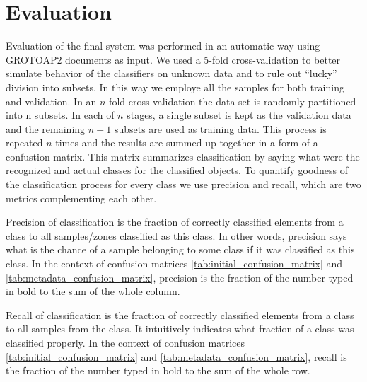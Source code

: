 \chapter{Evaluation}\label{chapter:evaluation}
Evaluation of the final system was performed in an automatic way using GROTOAP2 documents as input. We used a 5-fold cross-validation to better simulate behavior of the classifiers on unknown data and to rule out ``lucky'' division into subsets. In this way we employe all the samples for both training and validation. In an $n$-fold cross-validation the data set is randomly partitioned into n subsets. In each of $n$ stages, a single subset is kept as the validation data and the remaining $n-1$ subsets are used as training data. This process is repeated $n$ times and the results are summed up together in a form of a confustion matrix. This matrix summarizes classification by saying what were the recognized and actual classes for the classified objects.
To quantify goodness of the classification process for every class we use precision and recall, which are two metrics complementing each other.

Precision of classification is the fraction of correctly classified elements from a class to all samples/zones classified as this class. In other words, precision says what is the chance of a sample belonging to some class if it was classified as this class. In the context of confusion matrices \ref{tab:initial_confusion_matrix} and \ref{tab:metadata_confusion_matrix}, precision is the fraction of the number typed in bold to the sum of the whole column.

Recall of classification is the fraction of correctly classified elements from a class to all samples from the class. It intuitively indicates what fraction of a class was classified properly. In the context of confusion matrices \ref{tab:initial_confusion_matrix} and \ref{tab:metadata_confusion_matrix}, recall is the fraction of the number typed in bold to the sum of the whole row.

